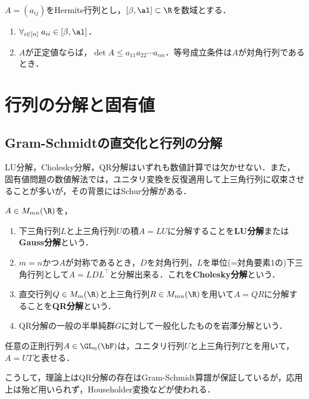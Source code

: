 \documentclass[uplatex, dvipdfmx]{jsreport}
\begin{document}
\begin{proposition}
    $A=(a_{ij})$をHermite行列とし，$[\beta,\al]\subset\R$を数域とする．
    \begin{enumerate}
        \item $\forall_{i\in[n]}\;a_{ii}\in[\beta,\al]$．
        \item $A$が正定値ならば，$\det A\le a_{11}a_{22}\cdots a_{nn}$．等号成立条件は$A$が対角行列であるとき．
    \end{enumerate}
\end{proposition}

\section{行列の分解と固有値}

\subsection{Gram-Schmidtの直交化と行列の分解}

\begin{tcolorbox}[colframe=ForestGreen, colback=ForestGreen!10!white,breakable,colbacktitle=ForestGreen!40!white,coltitle=black,fonttitle=\bfseries\sffamily,
title=]
    LU分解，Cholesky分解，QR分解はいずれも数値計算では欠かせない．また，
    固有値問題の数値解法では，ユニタリ変換を反復適用して上三角行列に収束させることが多いが，その背景にはSchur分解がある．
\end{tcolorbox}

\begin{definition}
    $A\in M_{mn}(\R)$を，
    \begin{enumerate}
        \item 下三角行列$L$と上三角行列$U$の積$A=LU$に分解することを\textbf{LU分解}または\textbf{Gauss分解}という．
        \item $m=n$かつ$A$が対称であるとき，$D$を対角行列，$L$を単位(=対角要素1の)下三角行列として$A=LDL^\top$と分解出来る．これを\textbf{Cholesky分解}という．
        \item 直交行列$Q\in M_m(\R)$と上三角行列$R\in M_{mn}(\R)$を用いて$A=QR$に分解することを\textbf{QR分解}という．
        \item QR分解の一般の半単純群$G$に対して一般化したものを岩澤分解という．
    \end{enumerate}
\end{definition}


\begin{proposition}
    任意の正則行列$A\in\GL_n(\bF)$は，ユニタリ行列$U$と上三角行列$T$とを用いて，$A=UT$と表せる．
\end{proposition}
\begin{remarks}
    こうして，理論上はQR分解の存在はGram-Schmidt算譜が保証しているが，応用上は殆ど用いられず，Householder変換などが使われる．
\end{remarks}
\end{document}
